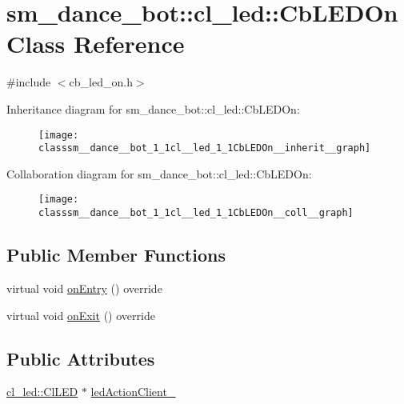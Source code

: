 \hypertarget{classsm__dance__bot_1_1cl__led_1_1CbLEDOn}{}\section{sm\+\_\+dance\+\_\+bot\+:\+:cl\+\_\+led\+:\+:Cb\+L\+E\+D\+On Class Reference}
\label{classsm__dance__bot_1_1cl__led_1_1CbLEDOn}


{\ttfamily \#include $<$cb\+\_\+led\+\_\+on.\+h$>$}



Inheritance diagram for sm\+\_\+dance\+\_\+bot\+:\+:cl\+\_\+led\+:\+:Cb\+L\+E\+D\+On\+:
\nopagebreak
\begin{figure}[H]
\begin{center}
\leavevmode
\texttt{[image: classsm\_\_dance\_\_bot\_1\_1cl\_\_led\_1\_1CbLEDOn\_\_inherit\_\_graph]}
\end{center}
\end{figure}


Collaboration diagram for sm\+\_\+dance\+\_\+bot\+:\+:cl\+\_\+led\+:\+:Cb\+L\+E\+D\+On\+:
\nopagebreak
\begin{figure}[H]
\begin{center}
\leavevmode
\texttt{[image: classsm\_\_dance\_\_bot\_1\_1cl\_\_led\_1\_1CbLEDOn\_\_coll\_\_graph]}
\end{center}
\end{figure}
\subsection*{Public Member Functions}
\begin{DoxyCompactItemize}
\item 
virtual void \hyperlink{classsm__dance__bot_1_1cl__led_1_1CbLEDOn_a3b7de8585d728becefb8c2c5cc3b6d95}{on\+Entry} () override
\item 
virtual void \hyperlink{classsm__dance__bot_1_1cl__led_1_1CbLEDOn_a60a82058c585b4d0398b531c1e1bdf0b}{on\+Exit} () override
\end{DoxyCompactItemize}
\subsection*{Public Attributes}
\begin{DoxyCompactItemize}
\item 
\hyperlink{classsm__dance__bot_1_1cl__led_1_1ClLED}{cl\+\_\+led\+::\+Cl\+L\+ED} $\ast$ \hyperlink{classsm__dance__bot_1_1cl__led_1_1CbLEDOn_a1ee516ed1a051922f804818ea429f2fe}{led\+Action\+Client\+\_\+}
\end{DoxyCompactItemize}


